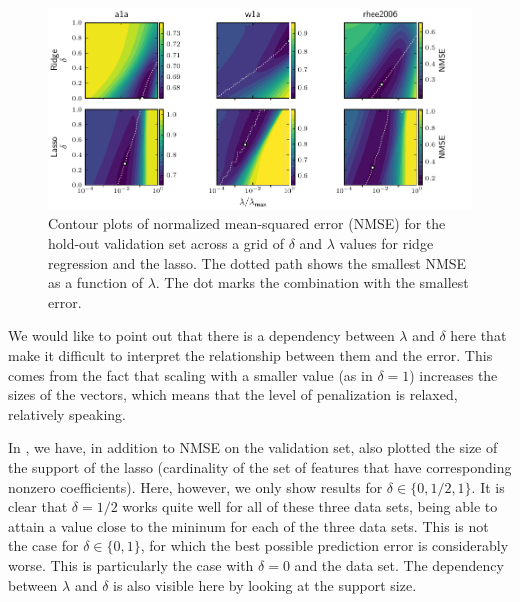\begin{figure}[htpb]
  \centering
  \includegraphics[]{plots/hyperopt_surfaces.pdf}
  \caption{%
    Contour plots of normalized mean-squared error (NMSE) for the hold-out validation set
    across a grid of \(\delta\) and \(\lambda\) values for ridge regression and the lasso. The
    dotted path shows the smallest NMSE as a function of \(\lambda\). The dot marks the
    combination with the smallest error. } \label{fig:hyperopt-contours}
\end{figure}

We would like to point out that there is a dependency between \(\lambda\) and \(\delta\)
here that make it difficult to interpret the relationship between them and the error. This
comes from the fact that scaling with a smaller value (as in \(\delta = 1\)) increases the
sizes of the vectors, which means that the level of penalization is relaxed, relatively
speaking.

In , we have, in addition to NMSE on the validation set, also
plotted the size of the support of the lasso (cardinality of the set of features that have
corresponding nonzero coefficients). Here, however, we only show results for \(\delta \in
\{0, 1/2, 1\}\). It is clear that \(\delta = 1/2\) works quite well for all of these three
data sets, being able to attain a value close to the mininum for each of the three data
sets. This is not the case for \(\delta \in \{0, 1\}\), for which the best possible
prediction error is considerably worse. This is particularly the case with \(\delta =0\)
and the  data set. The dependency between \(\lambda\) and \(\delta\) is also
visible here by looking at the support size.

